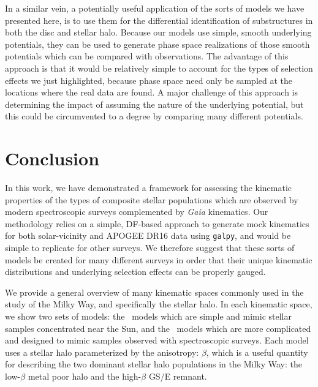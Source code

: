 In a similar vein, a potentially useful application of the sorts of models we have presented here, is to use them for the differential identification of substructures in both the disc and stellar halo. Because our models use simple, smooth underlying potentials, they can be used to generate phase space realizations of those smooth potentials which can be compared with observations. The advantage of this approach is that it would be relatively simple to account for the types of selection effects we just highlighted, because phase space need only be sampled at the locations where the real data are found. A major challenge of this approach is determining the impact of assuming the nature of the underlying potential, but this could be circumvented to a degree by comparing many different potentials.

\section{Conclusion}

In this work, we have demonstrated a framework for assessing the kinematic properties of the types of composite stellar populations which are observed by modern spectroscopic surveys complemented by \textit{Gaia} kinematics. Our methodology relies on a simple, DF-based approach to generate mock kinematics for both solar-vicinity and APOGEE DR16 data using \texttt{galpy}, and would be simple to replicate for other surveys. We therefore suggest that these sorts of models be created for many different surveys in order that their unique kinematic distributions and underlying selection effects can be properly gauged.

We provide a general overview of many kinematic spaces commonly used in the study of the Milky Way, and specifically the stellar halo. In each kinematic space, we show two sets of models: the \solar\ models which are simple and mimic stellar samples concentrated near the Sun, and the \survey\ models which are more complicated and designed to mimic samples observed with spectroscopic surveys. Each model uses a stellar halo parameterized by the anisotropy: $\beta$, which is a useful quantity for describing the two dominant stellar halo populations in the Milky Way: the low-$\beta$ metal poor halo and the high-$\beta$ GS/E remnant.

